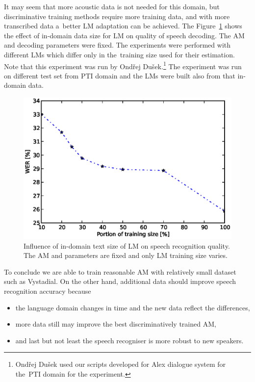It may seem that more acoustic data is not needed for this domain, but discriminative training methods require more training data, and with more transcribed data a~better \ac{LM} adaptation can be achieved.
The Figure~\ref{fig:partials_lm} shows the effect of in-domain data size for \ac{LM} on quality of speech decoding.
The \ac{AM}  and decoding parameters were fixed.
The experiments were performed with different \acp{LM} which differ only in the~training size used for their estimation. 
Note that this experiment was run by Ondřej Dušek.\footnote{Ondřej Dušek used our scripts developed for Alex dialogue system for the~\ac{PTI} domain for the experiment.}
The experiment was run on different test set from \acf{PTI} domain and the \acp{LM} were built also from that in-domain data.
\begin{figure}[!htp]
    \begin{center}
    \includegraphics[scale=0.7]{images/partial-lm-tri2b-bmmi.ps}
    \caption{Influence of in-domain text size of \ac{LM} on speech recognition quality. The \ac{AM}  and parameters are fixed and only \ac{LM} training size varies.}
    \label{fig:partials_lm} 
    \end{center}
\end{figure}

To conclude we are able to train reasonable \ac{AM} with relatively small dataset such as Vystadial.
On the other hand, additional data should improve speech recognition accuracy because
\begin{itemize}
    \item the language domain changes in time and the new data reflect the differences,
    \item more data still may improve the best discriminatively trained \ac{AM},
    \item and last but not least the speech recogniser is more robust to new speakers.
\end{itemize}

